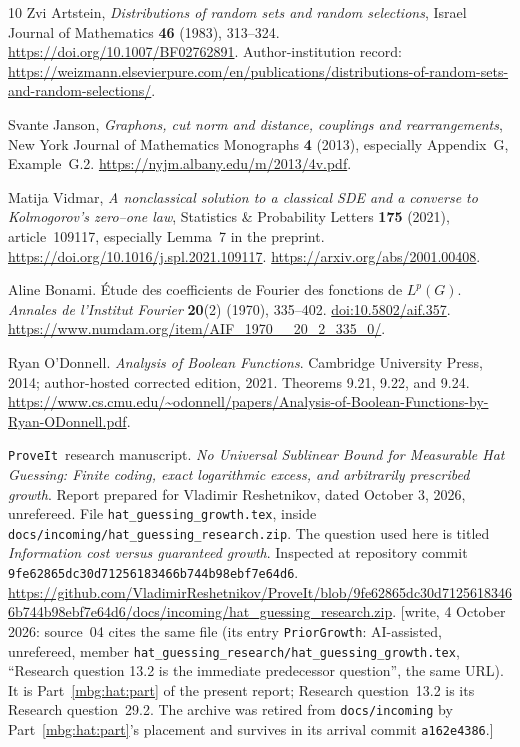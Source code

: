 \documentclass[11pt,letterpaper]{article}
\theoremstyle{definition}
\newcommand{\repo}{\texttt{ProveIt}}
\newcommand{\qrypin}{9fe62865dc30d71256183466b744b98ebf7e64d6}
\begin{document}
\begin{thebibliography}{10}
Zvi Artstein,
\emph{Distributions of random sets and random selections},
Israel Journal of Mathematics \textbf{46} (1983), 313--324.
\url{https://doi.org/10.1007/BF02762891}.
Author-institution record:
\url{https://weizmann.elsevierpure.com/en/publications/distributions-of-random-sets-and-random-selections/}.

Svante Janson,
\emph{Graphons, cut norm and distance, couplings and rearrangements},
New York Journal of Mathematics Monographs \textbf{4} (2013),
especially Appendix~G, Example~G.2.
\url{https://nyjm.albany.edu/m/2013/4v.pdf}.

Matija Vidmar,
\emph{A nonclassical solution to a classical SDE and a converse to Kolmogorov's zero--one law},
Statistics \& Probability Letters \textbf{175} (2021), article~109117,
especially Lemma~7 in the preprint.
\url{https://doi.org/10.1016/j.spl.2021.109117}.
\url{https://arxiv.org/abs/2001.00408}.

Aline Bonami.
\'Etude des coefficients de Fourier des fonctions de \(L^p(G)\).
\emph{Annales de l'Institut Fourier} \textbf{20}(2) (1970), 335--402.
\href{https://doi.org/10.5802/aif.357}{doi:10.5802/aif.357}.
\url{https://www.numdam.org/item/AIF_1970__20_2_335_0/}.

Ryan O'Donnell.
\emph{Analysis of Boolean Functions}.
Cambridge University Press, 2014; author-hosted corrected edition, 2021.
Theorems 9.21, 9.22, and 9.24.
\url{https://www.cs.cmu.edu/~odonnell/papers/Analysis-of-Boolean-Functions-by-Ryan-ODonnell.pdf}.

\repo\ research manuscript.
\emph{No Universal Sublinear Bound for Measurable Hat Guessing:
Finite coding, exact logarithmic excess, and arbitrarily prescribed growth}.
Report prepared for Vladimir Reshetnikov, dated October 3, 2026,
unrefereed. File \nolinkurl{hat_guessing_growth.tex}, inside
\nolinkurl{docs/incoming/hat_guessing_research.zip}.
The question used here is titled \emph{Information cost versus
guaranteed growth}.
Inspected at repository commit \texttt{\qrypin}.
\url{https://github.com/VladimirReshetnikov/ProveIt/blob/9fe62865dc30d71256183466b744b98ebf7e64d6/docs/incoming/hat_guessing_research.zip}.
{\small[write, 4 October 2026: source~04 cites the same file (its entry \texttt{PriorGrowth}: AI-assisted, unrefereed, member \nolinkurl{hat_guessing_research/hat_guessing_growth.tex}, ``Research question 13.2 is the immediate predecessor question'', the same URL). It is Part~\ref{mbg:hat:part} of the present report; Research question~13.2 is its Research question~29.2. The archive was retired from \texttt{docs/incoming} by Part~\ref{mbg:hat:part}'s placement and survives in its arrival commit \texttt{a162e4386}.]}


\end{thebibliography}
\end{document}
